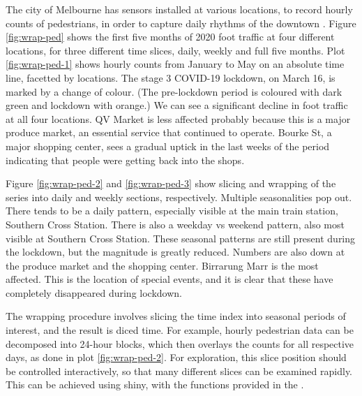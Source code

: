 The city of Melbourne has sensors installed at various locations, to
record hourly counts of pedestrians, in order to capture daily rhythms
of the downtown \citep{ped}. Figure \ref{fig:wrap-ped} shows the first
five months of 2020 foot traffic at four different locations, for three
different time slices, daily, weekly and full five months. Plot
\ref{fig:wrap-ped-1} shows hourly counts from January to May on an
absolute time line, facetted by locations. The stage 3 COVID-19
lockdown, on March 16, is marked by a change of colour. (The
pre-lockdown period is coloured with dark green and lockdown with
orange.) We can see a significant decline in foot traffic at all four
locations. QV Market is less affected probably because this is a major
produce market, an essential service that continued to operate. Bourke
St, a major shopping center, sees a gradual uptick in the last weeks of
the period indicating that people were getting back into the shops.

Figure \ref{fig:wrap-ped-2} and \ref{fig:wrap-ped-3} show slicing and
wrapping of the series into daily and weekly sections, respectively.
Multiple seasonalities pop out. There tends to be a daily pattern,
especially visible at the main train station, Southern Cross Station.
There is also a weekday vs weekend pattern, also most visible at
Southern Cross Station. These seasonal patterns are still present during
the lockdown, but the magnitude is greatly reduced. Numbers are also
down at the produce market and the shopping center. Birrarung Marr is
the most affected. This is the location of special events, and it is
clear that these have completely disappeared during lockdown.

The wrapping procedure involves slicing the time index into seasonal
periods of interest, and the result is diced time. For example, hourly
pedestrian data can be decomposed into 24-hour blocks, which then
overlays the counts for all respective days, as done in plot
\ref{fig:wrap-ped-2}. For exploration, this slice position should be
controlled interactively, so that many different slices can be examined
rapidly. This can be achieved using shiny, with the functions provided
in the .

